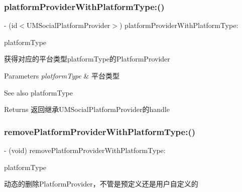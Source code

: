 \subsubsection{\texorpdfstring{platform\+Provider\+With\+Platform\+Type\+:()}{platformProviderWithPlatformType:()}\hspace{0.1cm}{\footnotesize\ttfamily [2/2]}}
{\footnotesize\ttfamily -\/ (id$<$U\+M\+Social\+Platform\+Provider$>$) platform\+Provider\+With\+Platform\+Type\+: \begin{DoxyParamCaption}\item[{(U\+M\+Social\+Platform\+Type)}]{platform\+Type }\end{DoxyParamCaption}}

获得对应的平台类型platform\+Type的\+Platform\+Provider


\begin{DoxyParams}{Parameters}
{\em platform\+Type} & 平台类型 \\
\hline
\end{DoxyParams}
\begin{DoxySeeAlso}{See also}
platform\+Type
\end{DoxySeeAlso}
\begin{DoxyReturn}{Returns}
返回继承\+U\+M\+Social\+Platform\+Provider的handle 
\end{DoxyReturn}
\mbox{\label{interface_u_m_social_manager_a21a09933474869bd2a402c47c11e6293}} 
\subsubsection{\texorpdfstring{remove\+Platform\+Provider\+With\+Platform\+Type\+:()}{removePlatformProviderWithPlatformType:()}\hspace{0.1cm}{\footnotesize\ttfamily [1/2]}}
{\footnotesize\ttfamily -\/ (void) remove\+Platform\+Provider\+With\+Platform\+Type\+: \begin{DoxyParamCaption}\item[{(U\+M\+Social\+Platform\+Type)}]{platform\+Type }\end{DoxyParamCaption}}

动态的删除\+Platform\+Provider，不管是预定义还是用户自定义的


